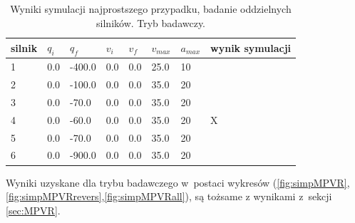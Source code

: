 \documentclass[a4paper, 12pt]{article}
\begin{document}
	\begin{table}[H]
	\centering
	\begin{tabular}{|m{2.5em}|m{4em}|m{4em}|m{4em}|m{4em}|m{4em}|m{4em}|m{5em}|}
	\hline
	silnik&$ q_i $ & $ q_f $ & $ v_i $ & $ v_f $ & $ v_{max} $ & $ a_{max} $&wynik symulacji\\
	\hline
	\hline
	\hspace{1em}1& 0.0 & -400.0 & 0.0 & 0.0 & 25.0 & 10&\hspace{2em}\checkmark\\ %
	\hline
	\hspace{1em}2& 0.0 & -100.0 & 0.0 & 0.0 & 35.0 & 20&\hspace{2em}\checkmark\\ %
	\hline
	\hspace{1em}3& 0.0 & -70.0 & 0.0 & 0.0 & 35.0 & 20&\hspace{2em}\checkmark\\ %
	\hline
	\hspace{1em}4& 0.0 & -60.0 & 0.0 & 0.0 & 35.0 & 20&\hspace{2em}X\\  %
	\hline
	\hspace{1em}5& 0.0 & -70.0 & 0.0 & 0.0 & 35.0 & 20&\hspace{2em}\checkmark\\  %
	\hline
	\hspace{1em}6& 0.0 & -900.0 & 0.0 & 0.0 & 35.0 & 20&\hspace{2em}\checkmark\\  %
	\hline
	\end{tabular}
	\caption{Wyniki symulacji najprostszego przypadku, badanie oddzielnych silników. Tryb badawczy.}
	\label{tab:setup4}
	\end{table}
	Wyniki uzyskane dla trybu badawczego w~postaci wykresów (\ref{fig:simpMPVR},\ref{fig:simpMPVRrevers},\ref{fig:simpMPVRall}), są tożsame z wynikami z~sekcji \ref{sec:MPVR}.
	
\end{document}

